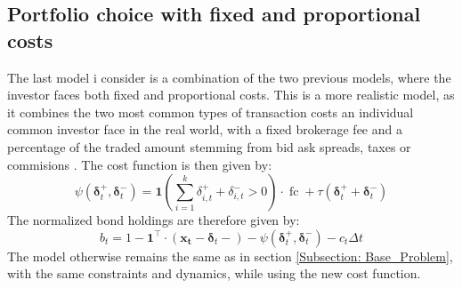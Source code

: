\documentclass[11pt]{article}
\begin{document}
\subsection{Portfolio choice with fixed and proportional costs}
The last model i consider is a combination of the two previous models, where the investor faces both fixed and proportional costs.
This is a more realistic model, as it combines the two most common types of transaction costs an individual common investor 
face in the real world, with a fixed brokerage fee and a percentage of the traded amount stemming from bid ask spreads, taxes or commisions \autocite{Lesmond1999}.
The cost function is then given by:
\begin{equation}
  \label{eq:Fixed_Proportional_Cost_Function}
  \psi (\boldsymbol{\delta}^{+}_{t}, \boldsymbol{\delta}^{-}_{t} ) = \mathbf{1} \left(  \sum^{k}_{i=1} \delta^{+}_{i,t} + \delta^{-}_{i,t}  > 0 \right) \cdot \operatorname{fc} + \tau (\boldsymbol{\delta}^{+}_{t} + \boldsymbol{\delta}^{-}_{t})
\end{equation}
The normalized bond holdings are therefore given by:
\begin{equation}\label{eq: fx_bond_holdings}
  b_{t} = 1 - \mathbf{1}^{\top} \cdot (\mathbf{x_t} - \boldsymbol{\delta}_t -) - \psi( \boldsymbol{\delta}^{+}_{t}, \boldsymbol{\delta}^{-}_{t} ) - c_t \Delta t
\end{equation}
The model otherwise remains the same as in section \ref{Subsection: Base_Problem}, with the same constraints and dynamics, while using the new cost function.

\ifdefined\COMPILINGMAIN
\else
\printbibliography
\end{document}
